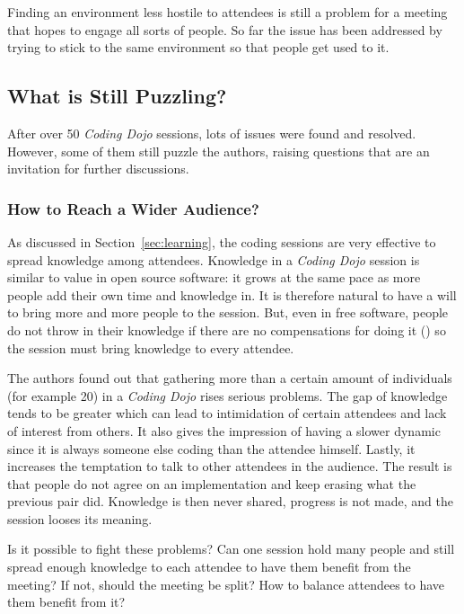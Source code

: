 Finding an environment less hostile to attendees is still a problem
for a meeting that hopes to engage all sorts of people. So far the
issue has been addressed by trying to stick to the same environment so
that people get used to it.

\subsection{What is Still Puzzling?}\label{ssub:puzzles}

After over 50 \emph{Coding Dojo} sessions, lots of issues were found
and resolved. However, some of them still puzzle the authors, raising
questions that are an invitation for further discussions.

\subsubsection{How to Reach a Wider Audience?}

As discussed in Section~\ref{sec:learning}, the coding sessions
are very effective to spread knowledge among attendees. Knowledge in a
\emph{Coding Dojo} session is similar to value in open source
software: it grows at the same pace as more people add their own time
and knowledge in. It is therefore natural to have a will to bring more
and more people to the session. But, even in free software, people do not
throw in their knowledge if there are no compensations for doing it
(\cite{RishabGhosh}) so the session must bring knowledge to every
attendee.

The authors found out that gathering more than a certain amount of
individuals (for example 20) in a \emph{Coding Dojo} rises serious
problems. The gap of knowledge tends to be greater which can lead to
intimidation of certain attendees and lack of interest from others. It
also gives the impression of having a slower dynamic since it is
always someone else coding than the attendee himself. Lastly, it
increases the temptation to talk to other attendees in the
audience. The result is that people do not agree on an implementation
and keep erasing what the previous pair did. Knowledge is then never
shared, progress is not made, and the session looses its meaning.

Is it possible to fight these problems? Can one session hold many
people and still spread enough knowledge to each attendee to have them
benefit from the meeting? If not, should the meeting be split? How
to balance attendees to have them benefit from it?

